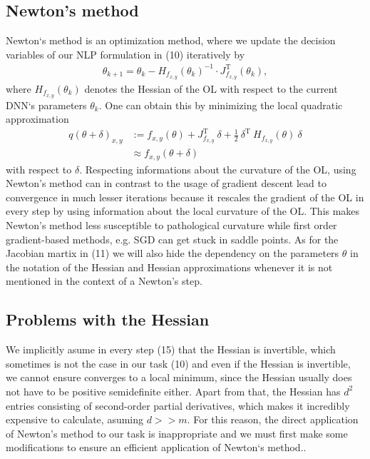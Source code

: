 \documentclass[conference]{IEEEtran}
\begin{document}
\subsection{Newton's method}\label{AA}
Newton`s method is an optimization method, where we update the decision variables of our NLP formulation in (10) iteratively by
\begin{align}
 \theta_{k+1} = \theta_{k} -H_{f_{x, y}}(\theta_{k})^{-1}\cdot J_{f_{x, y}}^{\mathrm{T}}(\theta_{k}),
\end{align}
where $H_{f_{x, y}}(\theta_{k})$ denotes the Hessian of the OL with respect to the current DNN`s parameters $\theta_{k}$. One can obtain this by minimizing the local quadratic approximation
\begin{align}
q(\theta + \delta)_{x, y} &:= f_{x, y}(\theta) + J_{f_{x, y}}^{\mathrm{T}}\:\delta + \frac{1}{2}\:\delta^{\mathrm{T}}\:H_{f_{x, y}}(\theta)\:\delta\\
&\approx f_{x, y}(\theta + \delta)
\end{align}
with respect to $\delta$. 
Respecting informations about the curvature of the OL, using Newton's method can in contrast to the usage of gradient descent lead to convergence in much lesser iterations because it rescales the gradient of the OL in every step by using information about the local curvature of the OL. This makes Newton's method less susceptible to pathological curvature while first order gradient-based methods, e.g. SGD can get stuck in saddle points. As for the Jacobian martix in (11) we will also hide the dependency on the parameters $\theta$ in the notation of the Hessian and Hessian approximations whenever it is not mentioned in the context of a Newton's step.

\subsection{Problems with the Hessian}
We implicitly asume in every step (15) that the Hessian is invertible, which sometimes is not the case in our task (10) and even if the Hessian is invertible, we cannot ensure converges to a local minimum, since the Hessian usually does not have to be positive semidefinite either. Apart from that, the Hessian has $d^{2}$ entries consisting of second-order partial derivatives, which makes it incredibly expensive to calculate, asuming $d>>m$. For this reason, the direct application of Newton's method to our task is inappropriate and we must first make some modifications to ensure an efficient application of Newton`s method..
\end{document}
